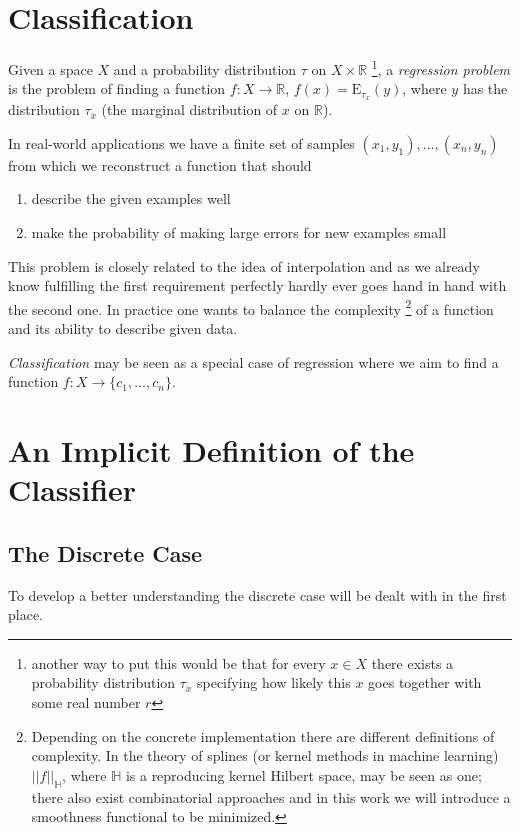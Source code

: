 \section{Classification}
Given a space $X$ and a probability distribution $\tau$ on $X\times \mathbb{R}$
\footnote{another way to put this would be that for every $x\in X$ there exists a probability distribution $\tau _x$ specifying how likely this $x$ goes together with some real number $r$},
a \textit{regression problem} is the problem of finding a function $f:X\rightarrow\mathbb{R}$, $f(x)=\mathrm{E}_{\tau _x}(y)$, where  $y$ has the distribution $\tau _x$ (the marginal distribution of $x$ on $\mathbb{R}$).

In real-world applications we have a finite set of samples $(x_1,y_1), \dots, (x_n,y_n)$ from which we reconstruct a function that should
\begin{enumerate}
    \item describe the given examples well
    \item make the probability of making large errors for new examples small
\end{enumerate}
This problem is closely related to the idea of interpolation and as we already know fulfilling the first requirement perfectly hardly ever goes hand in hand with the second one. In practice one wants to balance the complexity \footnote{Depending on the concrete implementation there are different definitions of complexity. In the theory of splines (or kernel methods in machine learning) $||f||_\mathbb{H}$, where $\mathbb{H}$ is a reproducing kernel Hilbert space, may be seen as one; there also exist combinatorial approaches and in this work we will introduce a smoothness functional to be minimized.} of a function and its ability to describe given data.

\textit{Classification} may be seen as a special case of regression where we aim to find a function $f:X\rightarrow \{c_1,\dots,c_n\}$.

\section{An Implicit Definition of the Classifier}
\subsection{The Discrete Case}
To develop a better understanding the discrete case will be dealt with in the first place.

